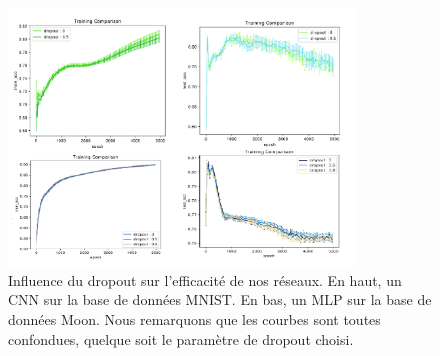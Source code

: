 \begin{figure}[!ht]
\centering
\includegraphics[width=260pt]{images/cnn/resultat_dropout.png}
\caption{Influence du dropout sur l'efficacité de nos réseaux. En haut, un CNN sur la base de données MNIST. En bas, un MLP sur la base de données Moon. Nous remarquons que les courbes sont toutes confondues, quelque soit le paramètre de dropout choisi.}
\label{resultat_dropout}
\end{figure}

 


